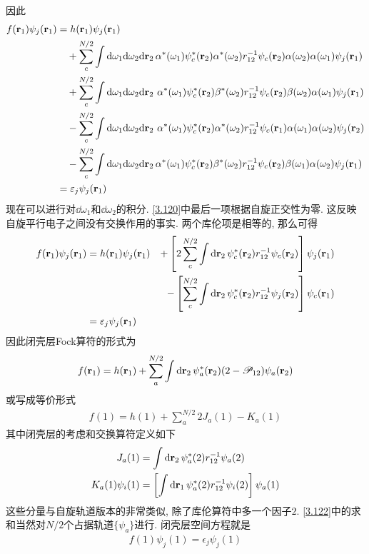 因此
\begin{align}
	f(\mathbf{r}_1)\psi_j(\mathbf{r}_1) & = h(\mathbf{r}_1)\psi_j(\mathbf{r}_1)\notag\\
	& {}\quad + \sum_c^{N/2}\int\dd\omega_1\dd\omega_2\dd{r}_2\,\alpha^*(\omega_1)\psi_c^*(\mathbf{r}_2)\alpha^*(\omega_2)\twoe\psi_c(\mathbf{r}_2)\alpha(\omega_2)\alpha(\omega_1)\psi_j(\mathbf{r}_1)\notag\\
	& {}\quad + \sum_c^{N/2}\int\dd\omega_1\dd\omega_2\dd{r}_2\,\,\alpha^*(\omega_1)\psi_c^*(\mathbf{r}_2)\beta^*(\omega_2)\twoe\psi_c(\mathbf{r}_2)\beta(\omega_2)\alpha(\omega_1)\psi_j(\mathbf{r}_1)\notag\\
	& {}\quad - \sum_c^{N/2}\int\dd\omega_1\dd\omega_2\dd{r}_2\,\,\alpha^*(\omega_1)\psi_c^*(\mathbf{r}_2)\alpha^*(\omega_2)\twoe\psi_c(\mathbf{r}_1)\alpha(\omega_1)\alpha(\omega_2)\psi_j(\mathbf{r}_2)\notag\\
	& {}\quad - \sum_c^{N/2}\int\dd\omega_1\dd\omega_2\dd{r}_2\,\alpha^*(\omega_1)\psi_c^*(\mathbf{r}_2)\beta^*(\omega_2)\twoe\psi_c(\mathbf{r}_2)\beta(\omega_1)\alpha(\omega_2)\psi_j(\mathbf{r}_1)\notag\\
	& = \epsilon_j\psi_j(\mathbf{r}_1)
	\label{3.120}
\end{align}
现在可以进行对$\dd\omega_1$和$\dd\omega_2$的积分. 
\eqref{3.120}中最后一项根据自旋正交性为零. 
这反映自旋平行电子之间没有交换作用的事实. 
两个库伦项是相等的, 
那么可得
\begin{alignat}{3}
	f(\mathbf{r}_1)\psi_j(\mathbf{r}_1) 
	& = h(\mathbf{r}_1)\psi_j(\mathbf{r}_1) & + \left[ 2\sum_c^{N/2}\int\dd{r}_2\,\psi_c^*(\mathbf{r}_2)\twoe\psi_c(\mathbf{r}_2)\right]\psi_j(\mathbf{r}_1)\notag\\
	&                                       & - \left[  \sum_c^{N/2}\int\dd{r}_2\,\psi_c^*(\mathbf{r}_2)\twoe\psi_j(\mathbf{r}_2)\right]\psi_c(\mathbf{r}_1)\notag\\
	& = \epsilon_j\psi_j(\bfr_1)&
\end{alignat}
因此闭壳层Fock算符的形式为
\begin{align}
	\label{3.122}
	f(\bfr_1) = h(\bfr_1) + \sum_a^{N/2}\int\dd{r}_2\,\psi_a^*(\bfr_2)(2-\scr{P}_{12})\psi_a(\bfr_2)
\end{align}
或写成等价形式
\begin{align}
	f(1) = h(1) + \sum_a^{N/2} 2J_a(1) - K_a(1)
\end{align}
其中闭壳层的考虑和交换算符定义如下
\begin{align}
	J_a(1) & = \int\dd{r}_2\,\psi_a^*(2)\twoe\psi_a(2) \label{3.124}\\
	K_a(1) \psi_i(1) & = \left[ \int\dd{r}_1\,\psi_a^*(2)\twoe\psi_i(2) \right]\psi_a(1) \label{3.125}
\end{align}
这些分量与自旋轨道版本的非常类似, 
除了库伦算符中多一个因子$2$. 
\eqref{3.122}中的求和当然对$N/2$个占据轨道$\{\psi_a\}$进行. 
闭壳层空间\hft 方程就是
\begin{align}
	f(1)\psi_j(1) = \epsilon_j\psi_j(1)
\end{align}

